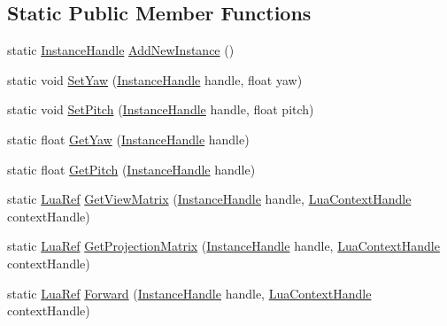 \subsection*{Static Public Member Functions}
\begin{DoxyCompactItemize}
\item 
static \hyperlink{_lua_object_instance_manager_8h_a317edebd09c13058779c942342947a0d}{Instance\+Handle} \hyperlink{class_camera_a_p_i_ad255bd03ff61394e3f9f70ffac703502}{Add\+New\+Instance} ()
\item 
static void \hyperlink{class_camera_a_p_i_a6ae15cbf0c1c5e97645ca6d9b4905b8f}{Set\+Yaw} (\hyperlink{_lua_object_instance_manager_8h_a317edebd09c13058779c942342947a0d}{Instance\+Handle} handle, float yaw)
\item 
static void \hyperlink{class_camera_a_p_i_a1a0543bac7b9bb4edea16ce8c50e8fd8}{Set\+Pitch} (\hyperlink{_lua_object_instance_manager_8h_a317edebd09c13058779c942342947a0d}{Instance\+Handle} handle, float pitch)
\item 
static float \hyperlink{class_camera_a_p_i_a4525769d9d7fc4bd32c5dbd08e195ad4}{Get\+Yaw} (\hyperlink{_lua_object_instance_manager_8h_a317edebd09c13058779c942342947a0d}{Instance\+Handle} handle)
\item 
static float \hyperlink{class_camera_a_p_i_abac2bbe6a37d2fa6d893b6360a9569a5}{Get\+Pitch} (\hyperlink{_lua_object_instance_manager_8h_a317edebd09c13058779c942342947a0d}{Instance\+Handle} handle)
\item 
static \hyperlink{_lua_context_8h_a2220f03700ba40e366f0ee2d684d5c91}{Lua\+Ref} \hyperlink{class_camera_a_p_i_a30cd699e6588dbbf5a993bee609e5c3a}{Get\+View\+Matrix} (\hyperlink{_lua_object_instance_manager_8h_a317edebd09c13058779c942342947a0d}{Instance\+Handle} handle, \hyperlink{_lua_context_8h_a2ffcc2d3ed21165072a1d7b61259bf14}{Lua\+Context\+Handle} context\+Handle)
\item 
static \hyperlink{_lua_context_8h_a2220f03700ba40e366f0ee2d684d5c91}{Lua\+Ref} \hyperlink{class_camera_a_p_i_a122c014eeb4fa24ce1eef7154d1ec934}{Get\+Projection\+Matrix} (\hyperlink{_lua_object_instance_manager_8h_a317edebd09c13058779c942342947a0d}{Instance\+Handle} handle, \hyperlink{_lua_context_8h_a2ffcc2d3ed21165072a1d7b61259bf14}{Lua\+Context\+Handle} context\+Handle)
\item 
static \hyperlink{_lua_context_8h_a2220f03700ba40e366f0ee2d684d5c91}{Lua\+Ref} \hyperlink{class_camera_a_p_i_aaf51389911812005f394aac2c4824a0e}{Forward} (\hyperlink{_lua_object_instance_manager_8h_a317edebd09c13058779c942342947a0d}{Instance\+Handle} handle, \hyperlink{_lua_context_8h_a2ffcc2d3ed21165072a1d7b61259bf14}{Lua\+Context\+Handle} context\+Handle)

\end{DoxyCompactItemize}

